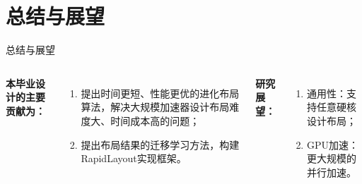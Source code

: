 \documentclass[10pt]{beamer}
\begin{document}
\section{总结与展望}

\begin{frame}{总结与展望}



  \begin{columns}[T, onlytextwidth]
    
    {\fontsize{8}{10}\selectfont
    {\bf 本毕业设计的主要贡献为：}
    \begin{enumerate}
      \item 提出时间更短、性能更优的进化布局算法，解决大规模加速器设计布局难度大、时间成本高的问题；
      \item 提出布局结果的迁移学习方法，构建RapidLayout实现框架。
    \end{enumerate}

    {\bf 研究展望：}
    \begin{enumerate}
      \item 通用性：支持任意硬核设计布局；
      \item GPU加速：更大规模的并行加速。
    \end{enumerate}

}
\end{columns}
\end{frame}
\end{document}
